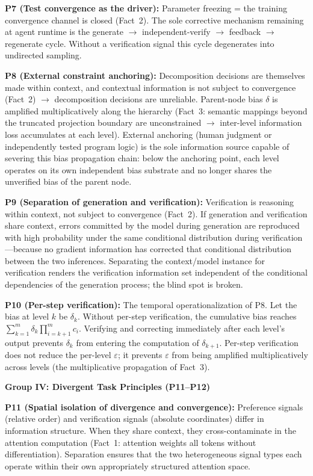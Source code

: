 \documentclass[11pt,a4paper]{article}
\theoremstyle{definition}
\begin{document}
\textbf{P7 (Test convergence as the driver):} Parameter freezing = the training convergence channel is closed (Fact~2). The sole corrective mechanism remaining at agent runtime is the generate $\to$ independent-verify $\to$ feedback $\to$ regenerate cycle. Without a verification signal this cycle degenerates into undirected sampling.

\textbf{P8 (External constraint anchoring):} Decomposition decisions are themselves made within context, and contextual information is not subject to convergence (Fact~2) $\to$ decomposition decisions are unreliable. Parent-node bias $\delta$ is amplified multiplicatively along the hierarchy (Fact~3: semantic mappings beyond the truncated projection boundary are unconstrained $\to$ inter-level information loss accumulates at each level). External anchoring (human judgment or independently tested program logic) is the sole information source capable of severing this bias propagation chain: below the anchoring point, each level operates on its own independent bias substrate and no longer shares the unverified bias of the parent node.

\textbf{P9 (Separation of generation and verification):} Verification is reasoning within context, not subject to convergence (Fact~2). If generation and verification share context, errors committed by the model during generation are reproduced with high probability under the same conditional distribution during verification---because no gradient information has corrected that conditional distribution between the two inferences. Separating the context/model instance for verification renders the verification information set independent of the conditional dependencies of the generation process; the blind spot is broken.

\textbf{P10 (Per-step verification):} The temporal operationalization of P8. Let the bias at level $k$ be $\delta_k$. Without per-step verification, the cumulative bias reaches $\sum_{k=1}^m \delta_k \prod_{i=k+1}^m c_i$. Verifying and correcting immediately after each level's output prevents $\delta_k$ from entering the computation of $\delta_{k+1}$. Per-step verification does not reduce the per-level $\varepsilon$; it prevents $\varepsilon$ from being amplified multiplicatively across levels (the multiplicative propagation of Fact~3).

\medskip
\textbf{Group IV: Divergent Task Principles (P11--P12)}

\textbf{P11 (Spatial isolation of divergence and convergence):} Preference signals (relative order) and verification signals (absolute coordinates) differ in information structure. When they share context, they cross-contaminate in the attention computation (Fact~1: attention weights all tokens without differentiation). Separation ensures that the two heterogeneous signal types each operate within their own appropriately structured attention space.
\end{document}
